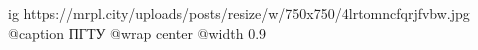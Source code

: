  
 
 
 
 

\ifcmt
  ig https://mrpl.city/uploads/posts/resize/w/750x750/4lrtomncfqrjfvbw.jpg
	@caption ПГТУ
  @wrap center
  @width 0.9
\fi
